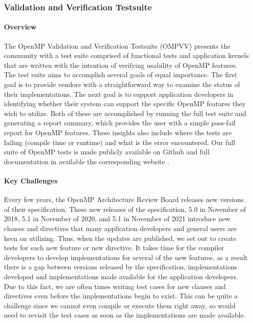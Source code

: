 \subsubsection{Validation and Verification Testsuite}

\paragraph{Overview}
The OpenMP Validation and Verification Testsuite (OMPVV) presents the community with a test suite comprised of functional tests and application kernels that are written with the intention of verifying usability of OpenMP features. The test suite aims to accomplish several goals of equal importance. The first goal is to provide vendors with a straightforward way to examine the status of their implementations. The next goal is to support application developers in identifying whether their system can support the specific OpenMP features they wish to utilize. Both of these are accomplished by running the full test suite and generating a report summary, which provides the user with a simple pass-fail report for OpenMP features. These insights also include where the tests are failing (compile time or runtime) and what is the error encountered. Our full suite of OpenMP tests is made publicly available on Github \cite{sollvevvgithub} and full documentation in available the corresponding website \cite{sollvevvwebsite}. 

\paragraph{Key Challenges}
Every few years, the OpenMP Architecture Review Board releases new versions of their specification. These new releases of the specification, 5.0 in November of 2018, 5.1 in November of 2020, and 5.1 in November of 2021 introduce new clauses and directives that many application developers and general users are keen on utilizing. Thus, when the updates are published, we set out to create tests for each new feature or new directive. It takes time for the compiler developers to develop implementations for several of the new features, as a result there is a gap between versions released by the specification, implementations developed and implementations made available for the application developers. Due to this fact, we are often times writing test cases for new clauses and directives even before the implementations begin to exist. This can be quite a challenge since we cannot even compile or execute them right away, so would need to revisit the test cases as soon as the implementations are made available. 

